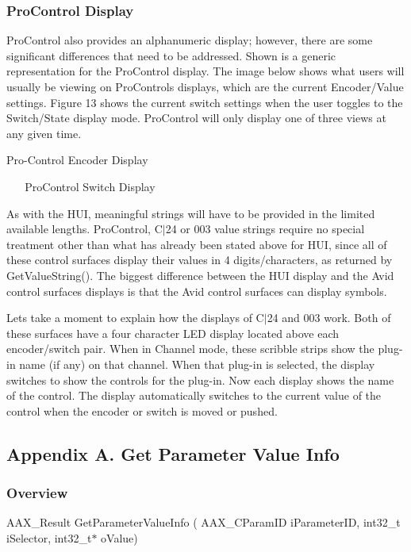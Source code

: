 \hypertarget{a00363_subsection_procontrol_display}{}\subsubsection{Pro\+Control Display}\label{a00363_subsection_procontrol_display}
Pro\+Control also provides an alphanumeric display; however, there are some significant differences that need to be addressed. Shown is a generic representation for the Pro\+Control display. The image below shows what users will usually be viewing on Pro\+Control\textquotesingle{}s displays, which are the current Encoder/\+Value settings. Figure 13 shows the current switch settings when the user toggles to the Switch/\+State display mode. Pro\+Control will only display one of three views at any given time.

  Pro-\/\+Control Encoder Display

~ ~   Pro\+Control Switch Display

As with the H\+U\+I, meaningful strings will have to be provided in the limited available lengths. Pro\+Control, C$\vert$24 or 003 value strings require no special treatment other than what has already been stated above for H\+U\+I, since all of these control surfaces display their values in 4 digits/characters, as returned by {\ttfamily Get\+Value\+String()}. The biggest difference between the H\+U\+I display and the Avid control surfaces\textquotesingle{} displays is that the Avid control surfaces can display symbols.

Let\textquotesingle{}s take a moment to explain how the displays of C$\vert$24 and 003 work. Both of these surfaces have a four character L\+E\+D display located above each encoder/switch pair. When in Channel mode, these scribble strips show the plug-\/in name (if any) on that channel. When that plug-\/in is selected, the display switches to show the controls for the plug-\/in. Now each display shows the name of the control. The display automatically switches to the current value of the control when the encoder or switch is moved or pushed. 

 \hypertarget{a00363_aax_page_table_guide_a_get_parameter_value_info}{}\subsection{Appendix A. Get Parameter Value Info}\label{a00363_aax_page_table_guide_a_get_parameter_value_info}
\hypertarget{a00363_subsection__overview}{}\subsubsection{Overview}\label{a00363_subsection__overview}
{\ttfamily A\+A\+X\+\_\+\+Result Get\+Parameter\+Value\+Info ( A\+A\+X\+\_\+\+C\+Param\+I\+D i\+Parameter\+I\+D, int32\+\_\+t i\+Selector, int32\+\_\+t$\ast$ o\+Value)}

